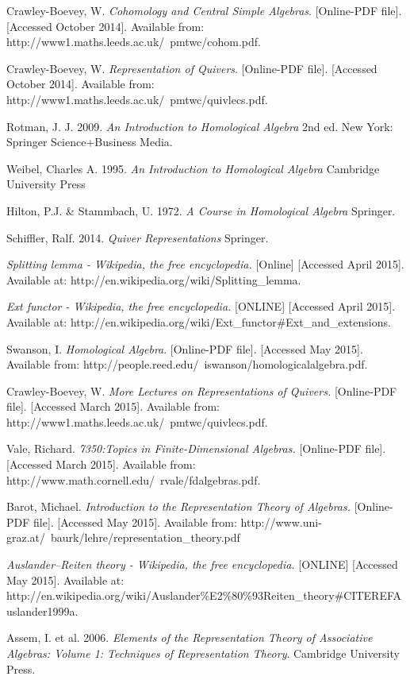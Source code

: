 \documentclass[11.5pt, twoside, a4paper, titlepage]{report}
\theoremstyle{definition}
\theoremstyle{plain}
\begin{document}
\begin{thebibliography}{99}

Crawley-Boevey, W.
\emph{Cohomology and Central Simple Algebras}. [Online-PDF file]. [Accessed October 2014].
Available from: http://www1.maths.leeds.ac.uk/~pmtwc/cohom.pdf.

Crawley-Boevey, W.
\emph{Representation of Quivers}. [Online-PDF file]. [Accessed October 2014].
Available from: http://www1.maths.leeds.ac.uk/~pmtwc/quivlecs.pdf.

Rotman, J. J.
2009.
\emph{An Introduction to Homological Algebra}
2nd ed.
New York: Springer Science+Business Media.

Weibel, Charles A.
1995.
\emph{An Introduction to Homological Algebra}
Cambridge University Press

Hilton, P.J. \& Stammbach, U.
1972.
\emph{A Course in Homological Algebra}
Springer.

Schiffler, Ralf.
2014.
\emph{Quiver Representations}
Springer.

\emph{Splitting lemma - Wikipedia, the free encyclopedia.} [Online]  [Accessed April 2015].
Available at: http://en.wikipedia.org/wiki/Splitting\_lemma.

\emph{Ext functor - Wikipedia, the free encyclopedia.} [ONLINE]  [Accessed April 2015].
Available at: http://en.wikipedia.org/wiki/Ext\_functor\#Ext\_and\_extensions.

Swanson, I.
\emph{Homological Algebra}. [Online-PDF file]. [Accessed May 2015].
Available from: http://people.reed.edu/~iswanson/homologicalalgebra.pdf.

Crawley-Boevey, W.
\emph{More Lectures on Representations of Quivers.} [Online-PDF file]. [Accessed March 2015].
Available from: http://www1.maths.leeds.ac.uk/~pmtwc/quivlecs.pdf.

Vale, Richard.
\emph{7350:Topics in Finite-Dimensional Algebras.} [Online-PDF file]. [Accessed March 2015].
Available from: http://www.math.cornell.edu/~rvale/fdalgebras.pdf.

Barot, Michael.
\emph{Introduction to the Representation Theory of Algebras.} [Online-PDF file]. [Accessed May 2015].
Available from: http://www.uni-graz.at/~baurk/lehre/representation\_theory.pdf

\emph{Auslander–Reiten theory - Wikipedia, the free encyclopedia.} [ONLINE] [Accessed May 2015].
Available at: http://en.wikipedia.org/wiki/Auslander\%E2\%80\%93Reiten\_theory\#CITEREFAuslander1999a.

Assem, I. et al.
2006. 
\emph{Elements of the Representation Theory of Associative Algebras: Volume 1: Techniques of Representation Theory}.
Cambridge University Press.
\end{thebibliography}
\end{document}

